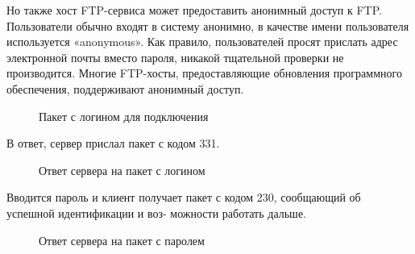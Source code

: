 \documentclass[a4paper, 14pt,russian]{article}
\begin{document}
	Но также хост FTP-сервиса может предоставить анонимный доступ к FTP. Пользователи обычно входят в систему анонимно, в качестве имени пользователя используется «anonymous». Как правило, пользователей просят прислать адрес электронной почты вместо пароля, никакой тщательной проверки не производится. Многие FTP-хосты, предоставляющие обновления программного обеспечения, поддерживают анонимный доступ.


	\begin{figure}[h!]
	\caption{Пакет с логином для подключения}
	\label{img:ftp_act1}
	\end{figure}
	
	В ответ, сервер прислал пакет с кодом 331.
	\begin{figure}[h!]
	\caption{Ответ сервера на пакет с логином}
	\label{img:ftp_act1}
	\end{figure}
	
	\newpage
	Вводится пароль и клиент получает пакет с кодом 230, сообщающий об успешной идентификации и воз-
	можности работать дальше.
	
	\begin{figure}[h!]
		\caption{Ответ сервера на пакет с паролем}
		\label{img:ftp_act1}
	\end{figure}
	
\end{document}
